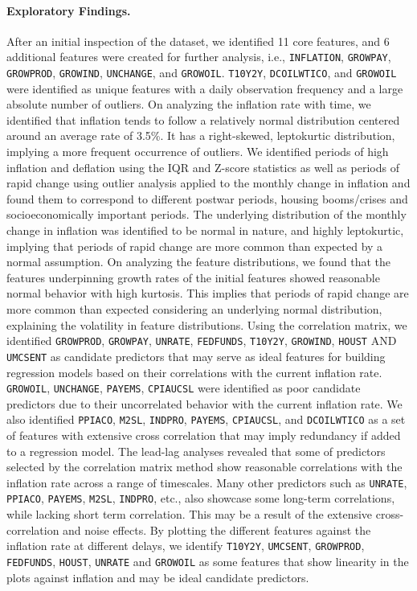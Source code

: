 \documentclass{article}
\begin{document}
\paragraph{Exploratory Findings.}
{\sloppy
After an initial inspection of the dataset, we identified 11 core features, and 6 additional features were created for further analysis, i.e., \texttt{INFLATION}, \texttt{GROWPAY}, \texttt{GROWPROD}, \texttt{GROWIND}, \texttt{UNCHANGE}, and \texttt{GROWOIL}. \texttt{T10Y2Y}, \texttt{DCOILWTICO}, and \texttt{GROWOIL} were identified as unique features with a daily observation frequency and a large absolute number of outliers. On analyzing the inflation rate with time, we identified that inflation tends to follow a relatively normal distribution centered around an average rate of 3.5\%. It has a right-skewed, leptokurtic distribution, implying a more frequent occurrence of outliers. We identified periods of high inflation and deflation using the IQR and Z-score statistics as well as periods of rapid change using outlier analysis applied to the monthly change in inflation and found them to correspond to different postwar periods, housing booms/crises and socioeconomically important periods. The underlying distribution of the monthly change in inflation was identified to be normal in nature, and highly leptokurtic, implying that periods of rapid change are more common than expected by a normal assumption. On analyzing the feature distributions, we found that the features underpinning growth rates of the initial features showed reasonable normal behavior with high kurtosis. This implies that periods of rapid change are more common than expected considering an underlying normal distribution, explaining the volatility in feature distributions. Using the correlation matrix, we identified \texttt{GROWPROD}, \texttt{GROWPAY}, \texttt{UNRATE}, \texttt{FEDFUNDS}, \texttt{T10Y2Y}, \texttt{GROWIND}, \texttt{HOUST} AND \texttt{UMCSENT} as candidate predictors that may serve as ideal features for building regression models based on their correlations with the current inflation rate. \texttt{GROWOIL}, \texttt{UNCHANGE}, \texttt{PAYEMS}, \texttt{CPIAUCSL} were identified as poor candidate predictors due to their uncorrelated behavior with the current inflation rate. We also identified \texttt{PPIACO}, \texttt{M2SL}, \texttt{INDPRO}, \texttt{PAYEMS}, \texttt{CPIAUCSL}, and \texttt{DCOILWTICO} as a set of features with extensive cross correlation that may imply redundancy if added to a regression model. The lead-lag analyses revealed that some of predictors selected by the correlation matrix method show reasonable correlations with the inflation rate across a range of timescales. Many other predictors such as \texttt{UNRATE}, \texttt{PPIACO}, \texttt{PAYEMS}, \texttt{M2SL}, \texttt{INDPRO}, etc., also showcase some long-term correlations, while lacking short term correlation. This may be a result of the extensive cross-correlation and noise effects. By plotting the different features against the inflation rate at different delays, we identify \texttt{T10Y2Y}, \texttt{UMCSENT}, \texttt{GROWPROD}, \texttt{FEDFUNDS}, \texttt{HOUST}, \texttt{UNRATE} and \texttt{GROWOIL} as some features that show linearity in the plots against inflation and may be ideal candidate predictors.
}
\end{document}
